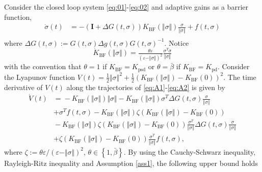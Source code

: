 \documentclass[twocolumn]{autart}    %
\begin{document}
\begin{pf}
Consider the closed loop system \eqref{eq:01}-\eqref{eq:02} and adaptive gains as a barrier function, 
\vspace{-1mm}
\begin{equation}\label{eq:A1}
\begin{aligned}
\dot{\sigma}(t)&=-(\mathbf{I}+\Delta G(t,\sigma))K_{\mathrm{BF}}(\Vert \sigma \Vert)\tfrac{\sigma}{\Vert \sigma \Vert}+f(t,\sigma)\\
\end{aligned}
\end{equation} where $\Delta G(t,\sigma):=G(t,\sigma)\Delta g(t,\sigma)G(t,\sigma)^{-1}$. Notice %
\begin{equation}\label{eq:A2}
\dot{K}_{\mathrm{BF}}(\Vert \sigma \Vert)=\tfrac{\theta \varepsilon}{(\varepsilon-\Vert \sigma \Vert)^2}\tfrac{\sigma^T\dot{\sigma}}{\Vert \sigma \Vert}
\end{equation} with the convention that $\theta=1$ if $K_{\mathrm{BF}}=K_{\mathrm{psd}}$ or $\theta=\bar{\beta}$ if $K_{\mathrm{BF}}=K_{\mathrm{pd}}$.  Consider the Lyapunov function $V(t)=\tfrac{1}{2}\Vert \sigma \Vert^2+\tfrac{1}{2}(K_{\mathrm{BF}}(\Vert \sigma \Vert)-K_{\mathrm{BF}}(0))^2$. The time derivative of $V(t)$ along the trajectories of \eqref{eq:A1}-\eqref{eq:A2} is given by
\vspace{-1mm}
\begin{equation*}
\begin{split}
\dot{V}(t)&\!=\!-K_{\!\mathrm{BF}\!}(\Vert \sigma \Vert)\Vert \sigma \Vert-K_{\!\mathrm{BF}\!}(\Vert \sigma \Vert) \sigma^T\Delta G(t,\sigma)\tfrac{\sigma}{\Vert \sigma \Vert}\\
&+\sigma^Tf(t,\sigma)-K_{\!\mathrm{BF}\!}(\Vert \sigma \Vert)\zeta(K_{\!\mathrm{BF}\!}(\Vert \sigma \Vert)
\!-\!K_{\!\mathrm{BF}\!}(0))\\
&\!-\!K_{\!\mathrm{BF}\!}(\Vert \sigma \Vert)\zeta(K_{\!\mathrm{BF}\!}(\Vert \sigma \Vert)\!-\!K_{\!\mathrm{BF}\!}(0))\!\tfrac{\sigma^T}{\Vert \sigma \Vert}\Delta G(t,\sigma)\tfrac{\sigma}{\Vert \sigma \Vert}\\
&+\zeta(K_{\!\mathrm{BF}\!}(\Vert \sigma \Vert)\!-\!K_{\!\mathrm{BF}\!}(0))\tfrac{\sigma^T}{\Vert \sigma \Vert}f(t,\sigma),
\end{split}
\end{equation*} where $\zeta:=\theta \varepsilon/(\varepsilon-\Vert \sigma \Vert)^2$, $\theta \in \left\lbrace  1, \bar{\beta} \right \rbrace$. By using the Cauchy-Schwarz inequality, Rayleigh-Ritz inequality and Assumption \ref{ass1}, the following upper bound holds

\end{pf}
\end{document}
